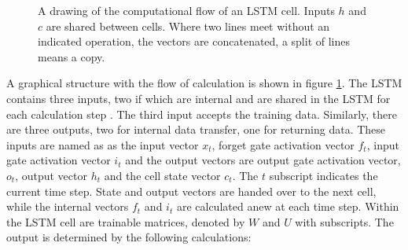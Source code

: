 \documentclass[10pt, a4paper]{UUThesisTemplate}
\begin{document}
\begin{figure}
\caption{A drawing of the computational flow of an LSTM cell. Inputs $h$ and $c$ are shared between cells. Where two lines meet without an indicated operation, the vectors are concatenated, a split of lines means a copy.}\label{fig:LSTMdrawing}
\end{figure}

A graphical structure with the flow of calculation is shown in figure \ref{fig:LSTMdrawing}. The LSTM contains three inputs, two if which are internal and are shared in the LSTM for each calculation step \cite{LSTM}. The third input accepts the training data. Similarly, there are three outputs, two for internal data transfer, one for returning data. These inputs are named as as the input vector $x_t$, forget gate activation vector $f_t$, input gate activation vector $i_t$ and the output vectors are output gate activation vector, $o_t$, output vector $h_t$ and the cell state vector $c_t$. The $t$ subscript indicates the current time step. State and output vectors are handed over to the next cell, while the internal vectors $f_t$ and $i_t$ are calculated anew at each time step. Within the LSTM cell are trainable matrices, denoted by $W$ and $U$ with subscripts. The output is determined by the following calculations:
\end{document}
